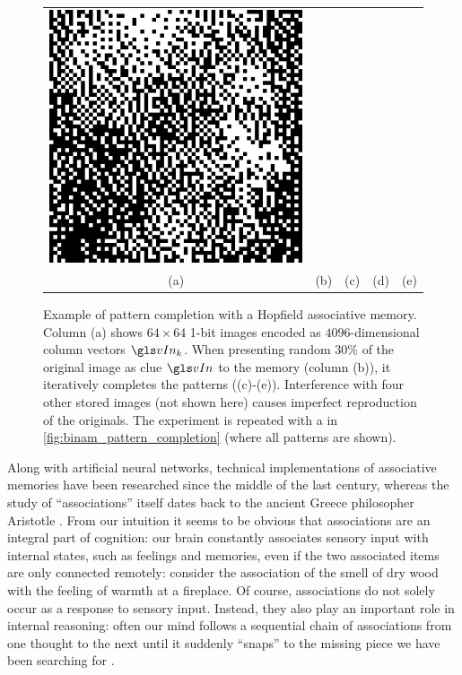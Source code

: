 \begin{figure}
\begin{tabular}{c c c c c}
		\includegraphics[width=\tilewidth,interpolate=false]{media/chp2/associative_memory/hopfield/07_04_activation_scaled_crushed.png}\\%
		(a) & (b) & (c) & (d) & (e)
	\end{tabular}
	\caption[Pattern completion in a Hopfield associative memory]{Example of pattern completion with a Hopfield associative memory. Column (a) shows $64 \times 64$ 1-bit images encoded as $4096$-dimensional column vectors $\vIn_k$. When presenting random $30\%$ of the original image as clue $\vIn$ to the memory (column (b)), it iteratively completes the patterns ((c)-(e)). Interference with four other stored images (not shown here) causes imperfect reproduction of the originals. The experiment is repeated with a \BiNAM in \cref{fig:binam_pattern_completion} (where all patterns are shown).}
	\label{fig:hopfield_pattern_completion}
\end{figure}

Along with artificial neural networks, technical implementations of associative memories have been researched since the middle of the last century, whereas the study of \enquote{associations} itself dates back to the ancient Greece philosopher Aristotle \cite{warren1916mental}. From our intuition it seems to be obvious that associations are an integral part of cognition: our brain constantly associates sensory input with internal states, such as feelings and memories, even if the two associated items are only connected remotely: consider the association of the smell of dry wood with the feeling of warmth at a fireplace. Of course, associations do not solely occur as a response to sensory input. Instead, they also play an important role in internal reasoning: often our mind follows a sequential chain of associations from one thought to the next until it suddenly \enquote{snaps} to the missing piece we have been searching for \cite{palm2013neural}.

